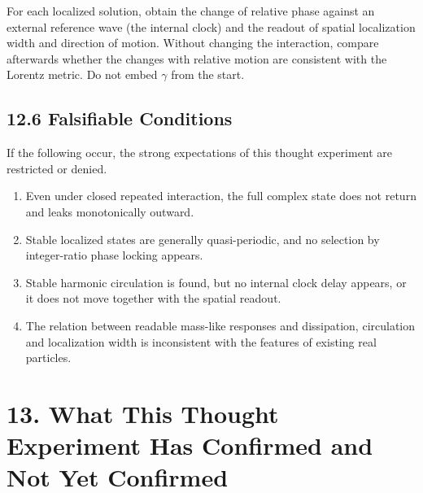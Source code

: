 \documentclass[
  a4paper,
]{article}
\providecommand{\tightlist}{%
  \setlength{\itemsep}{0pt}\setlength{\parskip}{0pt}}
\begin{document}
For each localized solution, obtain the change of relative phase against
an external reference wave (the internal clock) and the readout of
spatial localization width and direction of motion. Without changing the
interaction, compare afterwards whether the changes with relative motion
are consistent with the Lorentz metric. Do not embed \(\gamma\) from the
start.

\subsection{12.6 Falsifiable Conditions}\label{falsifiable-conditions}

If the following occur, the strong expectations of this thought
experiment are restricted or denied.

\begin{enumerate}
\def\labelenumi{\arabic{enumi}.}
\tightlist
\item
  Even under closed repeated interaction, the full complex state does
  not return and leaks monotonically outward.
\item
  Stable localized states are generally quasi-periodic, and no selection
  by integer-ratio phase locking appears.
\item
  Stable harmonic circulation is found, but no internal clock delay
  appears, or it does not move together with the spatial readout.
\item
  The relation between readable mass-like responses and dissipation,
  circulation and localization width is inconsistent with the features
  of existing real particles.
\end{enumerate}

\section{13. What This Thought Experiment Has Confirmed and Not Yet
Confirmed}\label{what-this-thought-experiment-has-confirmed-and-not-yet-confirmed}
\end{document}
